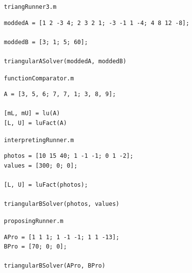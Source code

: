 \documentclass[english,notitlepage,letterpaper, 10pt]{article} %
\begin{document}
\texttt{triangRunner3.m}

\begin{lstlisting}
moddedA = [1 2 -3 4; 2 3 2 1; -3 -1 1 -4; 4 8 12 -8];

moddedB = [3; 1; 5; 60];

triangularASolver(moddedA, moddedB) 
\end{lstlisting}

\texttt{functionComparator.m}

\begin{lstlisting}
A = [3, 5, 6; 7, 7, 1; 3, 8, 9];

[mL, mU] = lu(A)
[L, U] = luFact(A)
\end{lstlisting}

\texttt{interpretingRunner.m}

\begin{lstlisting}
photos = [10 15 40; 1 -1 -1; 0 1 -2];
values = [300; 0; 0];

[L, U] = luFact(photos);

triangularBSolver(photos, values)   
\end{lstlisting}

\texttt{proposingRunner.m}

\begin{lstlisting}
APro = [1 1 1; 1 -1 -1; 1 1 -13];
BPro = [70; 0; 0];

triangularBSolver(APro, BPro)
\end{lstlisting}
\end{document}

